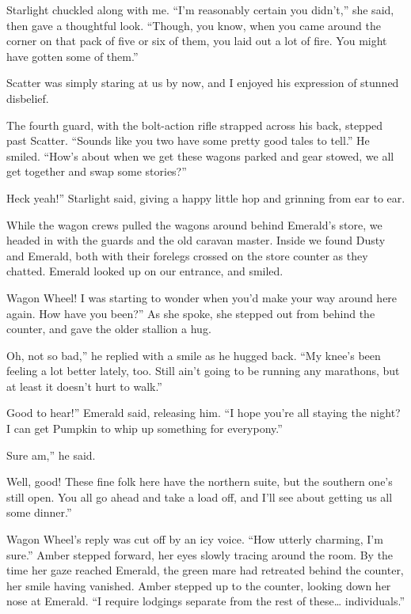 Starlight chuckled along with me. “I’m reasonably certain you didn’t,” she said, then gave a thoughtful look. “Though, you know, when you came around the corner on that pack of five or six of them, you laid out a lot of fire. You might have gotten some of them.”

Scatter was simply staring at us by now, and I enjoyed his expression of stunned disbelief.

The fourth guard, with the bolt-action rifle strapped across his back, stepped past Scatter. “Sounds like you two have some pretty good tales to tell.” He smiled. “How’s about when we get these wagons parked and gear stowed, we all get together and swap some stories?”

\leavevmode{}Heck yeah!” Starlight said, giving a happy little hop and grinning from ear to ear.

While the wagon crews pulled the wagons around behind Emerald’s store, we headed in with the guards and the old caravan master. Inside we found Dusty and Emerald, both with their forelegs crossed on the store counter as they chatted. Emerald looked up on our entrance, and smiled.

\leavevmode{}Wagon Wheel! I was starting to wonder when you’d make your way around here again. How have you been?” As she spoke, she stepped out from behind the counter, and gave the older stallion a hug.

\leavevmode{}Oh, not so bad,” he replied with a smile as he hugged back. “My knee’s been feeling a lot better lately, too. Still ain’t going to be running any marathons, but at least it doesn’t hurt to walk.”

\leavevmode{}Good to hear!” Emerald said, releasing him. “I hope you’re all staying the night? I can get Pumpkin to whip up something for everypony.”

\leavevmode{}Sure am,” he said.

\leavevmode{}Well, good! These fine folk here have the northern suite, but the southern one’s still open. You all go ahead and take a load off, and I’ll see about getting us all some dinner.”

Wagon Wheel’s reply was cut off by an icy voice. “How utterly charming, I’m sure.” Amber stepped forward, her eyes slowly tracing around the room. By the time her gaze reached Emerald, the green mare had retreated behind the counter, her smile having vanished. Amber stepped up to the counter, looking down her nose at Emerald. “I require lodgings separate from the rest of these… individuals.”

